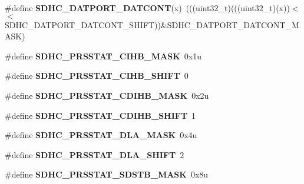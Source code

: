 \begin{DoxyCompactItemize}
\item 
\#define {\bfseries S\+D\+H\+C\+\_\+\+D\+A\+T\+P\+O\+R\+T\+\_\+\+D\+A\+T\+C\+O\+NT}(x)~(((uint32\+\_\+t)(((uint32\+\_\+t)(x))$<$$<$S\+D\+H\+C\+\_\+\+D\+A\+T\+P\+O\+R\+T\+\_\+\+D\+A\+T\+C\+O\+N\+T\+\_\+\+S\+H\+I\+FT))\&S\+D\+H\+C\+\_\+\+D\+A\+T\+P\+O\+R\+T\+\_\+\+D\+A\+T\+C\+O\+N\+T\+\_\+\+M\+A\+SK)\hypertarget{group__SDHC__Register__Masks_gaa6e82dc6e7cf2202094a103b0006ba05}{}\label{group__SDHC__Register__Masks_gaa6e82dc6e7cf2202094a103b0006ba05}

\item 
\#define {\bfseries S\+D\+H\+C\+\_\+\+P\+R\+S\+S\+T\+A\+T\+\_\+\+C\+I\+H\+B\+\_\+\+M\+A\+SK}~0x1u\hypertarget{group__SDHC__Register__Masks_gaaba7df21329c057fa8906bcdffefb948}{}\label{group__SDHC__Register__Masks_gaaba7df21329c057fa8906bcdffefb948}

\item 
\#define {\bfseries S\+D\+H\+C\+\_\+\+P\+R\+S\+S\+T\+A\+T\+\_\+\+C\+I\+H\+B\+\_\+\+S\+H\+I\+FT}~0\hypertarget{group__SDHC__Register__Masks_ga104678507322e6937284cec9aabbe2ff}{}\label{group__SDHC__Register__Masks_ga104678507322e6937284cec9aabbe2ff}

\item 
\#define {\bfseries S\+D\+H\+C\+\_\+\+P\+R\+S\+S\+T\+A\+T\+\_\+\+C\+D\+I\+H\+B\+\_\+\+M\+A\+SK}~0x2u\hypertarget{group__SDHC__Register__Masks_ga41cd86790ec73a0f81fe4910f8e6b379}{}\label{group__SDHC__Register__Masks_ga41cd86790ec73a0f81fe4910f8e6b379}

\item 
\#define {\bfseries S\+D\+H\+C\+\_\+\+P\+R\+S\+S\+T\+A\+T\+\_\+\+C\+D\+I\+H\+B\+\_\+\+S\+H\+I\+FT}~1\hypertarget{group__SDHC__Register__Masks_gaebffc8f5a96e2405094e614d8ab72bc2}{}\label{group__SDHC__Register__Masks_gaebffc8f5a96e2405094e614d8ab72bc2}

\item 
\#define {\bfseries S\+D\+H\+C\+\_\+\+P\+R\+S\+S\+T\+A\+T\+\_\+\+D\+L\+A\+\_\+\+M\+A\+SK}~0x4u\hypertarget{group__SDHC__Register__Masks_ga609f9258fa078236470445ebfcd2e9ac}{}\label{group__SDHC__Register__Masks_ga609f9258fa078236470445ebfcd2e9ac}

\item 
\#define {\bfseries S\+D\+H\+C\+\_\+\+P\+R\+S\+S\+T\+A\+T\+\_\+\+D\+L\+A\+\_\+\+S\+H\+I\+FT}~2\hypertarget{group__SDHC__Register__Masks_gaad30094ca6309410952688acf6ed5f07}{}\label{group__SDHC__Register__Masks_gaad30094ca6309410952688acf6ed5f07}

\item 
\#define {\bfseries S\+D\+H\+C\+\_\+\+P\+R\+S\+S\+T\+A\+T\+\_\+\+S\+D\+S\+T\+B\+\_\+\+M\+A\+SK}~0x8u\hypertarget{group__SDHC__Register__Masks_ga45ba66986bd9e2c6419e1a4358b6a05e}{}\label{group__SDHC__Register__Masks_ga45ba66986bd9e2c6419e1a4358b6a05e}


\end{DoxyCompactItemize}
